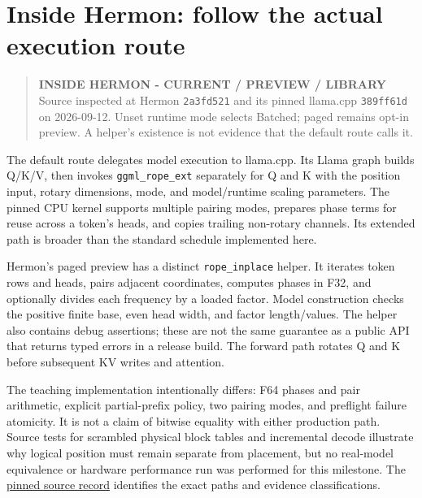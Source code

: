 \section{Inside Hermon: follow the actual execution
route}\label{inside-hermon-follow-the-actual-execution-route}


\begin{quote}
\textbf{INSIDE HERMON - CURRENT / PREVIEW / LIBRARY} Source inspected at
Hermon \texttt{2a3fd521} and its pinned llama.cpp \texttt{389ff61d} on
2026-09-12. Unset runtime mode selects Batched; paged remains opt-in
preview. A helper's existence is not evidence that the default route
calls it.
\end{quote}

The default route delegates model execution to llama.cpp. Its Llama
graph builds Q/K/V, then invokes \texttt{ggml\_rope\_ext} separately for
Q and K with the position input, rotary dimensions, mode, and
model/runtime scaling parameters. The pinned CPU kernel supports
multiple pairing modes, prepares phase terms for reuse across a token's
heads, and copies trailing non-rotary channels. Its extended path is
broader than the standard schedule implemented here.

Hermon's paged preview has a distinct \texttt{rope\_inplace} helper. It
iterates token rows and heads, pairs adjacent coordinates, computes
phases in F32, and optionally divides each frequency by a loaded factor.
Model construction checks the positive finite base, even head width, and
factor length/values. The helper also contains debug assertions; these
are not the same guarantee as a public API that returns typed errors in
a release build. The forward path rotates Q and K before subsequent KV
writes and attention.

The teaching implementation intentionally differs: F64 phases and pair
arithmetic, explicit partial-prefix policy, two pairing modes, and
preflight failure atomicity. It is not a claim of bitwise equality with
either production path. Source tests for scrambled physical block tables
and incremental decode illustrate why logical position must remain
separate from placement, but no real-model equivalence or hardware
performance run was performed for this milestone. The
\href{https://github.com/hermonai/inside-the-llm-engine/blob/astra-visual-rewrite/research/part-02/chapter-09-position-rope.md}{pinned
source record} identifies the exact paths and evidence classifications.

